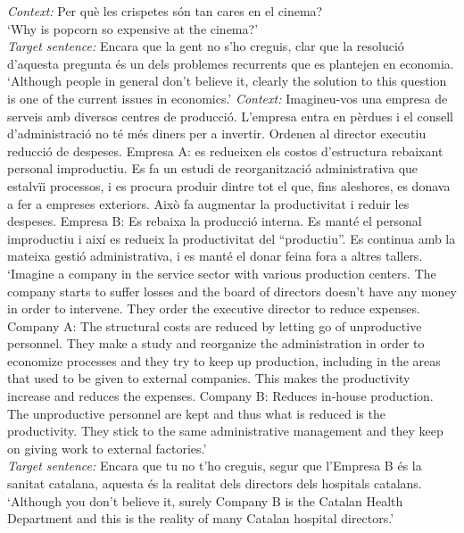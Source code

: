 \ea
\ea\label{ex:cat49} \textit{Context:} Per què les crispetes són tan cares en el cinema?\\
`Why is popcorn so expensive at the cinema?'\\
\textit{Target sentence:} Encara que la gent no s'ho creguis, clar que la resolució d'aquesta pregunta és un dels problemes recurrents que es plantejen en economia.  \\
`Although  people in general don't believe it, clearly the solution to this question is one of the current issues in economics.' 
\ex\label{ex:cat751} \textit{Context:} Imagineu-vos una empresa de serveis amb diversos centres de producció. L'empresa entra en pèrdues i el consell d'administració no té més diners per a invertir.  Ordenen al director executiu reducció de despeses.  Empresa A: es redueixen els costos d'estructura rebaixant personal improductiu.  Es fa un estudi de reorganització administrativa que estalvïi processos, i es procura produir dintre tot el que, fins aleshores, es donava a fer a empreses exteriors. Això fa augmentar la productivitat i reduir les despeses.  Empresa B: Es rebaixa la producció interna.  Es manté el personal improductiu i així es redueix la productivitat del “productiu”.  Es continua amb la mateixa gestió administrativa, i es manté el donar feina fora a altres tallers.  \\
`Imagine a company in the service sector with various production centers. The company starts to suffer losses and the board of directors doesn't have any money in order to intervene. They order the executive director to reduce expenses. Company A: The structural costs are reduced by letting go of unproductive personnel. They make a study and reorganize the administration in order to economize processes and they try to keep up production, including in the areas that used to be given to external companies. This makes the productivity increase and reduces the expenses. Company B: Reduces  in-house production. The unproductive personnel are kept and thus what is reduced is the productivity. They stick to the same administrative management and they keep on giving work to external factories.' \\
\textit{Target sentence:}
Encara que tu no t'ho creguis, segur que l'Empresa B és la sanitat catalana, aquesta és la realitat dels directors dels hospitals catalans.\\
`Although you don't believe it, surely Company B is the Catalan Health Department and this is the reality of many  Catalan hospital directors.' 
\z
\z



